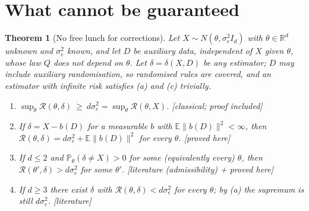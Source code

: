 \documentclass[10pt,a4paper]{article}
\theoremstyle{plain}
\newtheorem{theorem}{Theorem}[section]
\theoremstyle{definition}
\theoremstyle{remark}
\newcommand{\R}{\mathbb{R}}
\newcommand{\E}{\mathbb{E}}
\newcommand{\Prob}{\mathbb{P}}
\newcommand{\risk}{\mathcal{R}}
\newcommand{\norm}[1]{\lVert #1\rVert}
\newcommand{\status}[1]{\textsf{\small [#1]}}
\begin{document}
\section{What cannot be guaranteed}\label{sec:cannot}

\begin{theorem}[No free lunch for corrections]\label{thm:nfl}
Let $X\sim N(\theta,\sigma_e^2 I_d)$ with $\theta\in\R^d$ unknown and $\sigma_e^2$ known, and let $D$ be auxiliary data, independent of $X$ given $\theta$, whose law $Q$ does not depend on $\theta$. Let $\delta=\delta(X,D)$ be any estimator; $D$ may include auxiliary randomisation, so randomised rules are covered, and an estimator with infinite risk satisfies (a) and (c) trivially.
\begin{enumerate}[leftmargin=2em,label=(\alph*)]
\item $\sup_{\theta}\risk(\theta,\delta)\ \ge\ d\sigma_e^2=\sup_\theta\risk(\theta,X)$. \status{classical; proof included}
\item If $\delta=X-b(D)$ for a measurable $b$ with $\E\norm{b(D)}^2<\infty$, then $\risk(\theta,\delta)=d\sigma_e^2+\E\norm{b(D)}^2$ for every $\theta$. \status{proved here}
\item If $d\le2$ and $\Prob_\theta(\delta\neq X)>0$ for some (equivalently every) $\theta$, then $\risk(\theta',\delta)>d\sigma_e^2$ for some $\theta'$. \status{literature (admissibility) + proved here}
\item If $d\ge3$ there exist $\delta$ with $\risk(\theta,\delta)<d\sigma_e^2$ for every $\theta$; by (a) the supremum is still $d\sigma_e^2$. \status{literature}
\end{enumerate}
\end{theorem}
\end{document}
